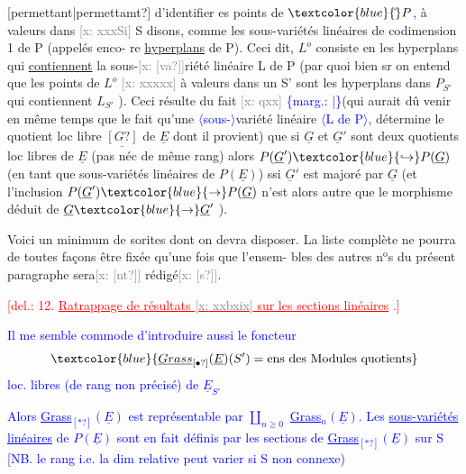 \documentclass[11pt]{article}
\newcommand{\scanpage}[1]{\par\bigskip\noindent{\small\sffamily[scan #1]}\par}
\newcommand{\mspage}[1]{{\small\sffamily[p.\,#1]}}
\newcommand{\hand}[1]{\textcolor{blue}{#1}}
\let\over\relax
\newcommand{\over}[2]{\textcolor{gray}{#1}\textcolor{blue}{\ensuremath{^{\!\nearrow}}#2}}
\newcommand{\inserted}[2][]{\textcolor{blue}{$\langle$#2$\rangle$}}
\newcommand{\margin}[1]{\textcolor{blue}{\{\textsf{marg.:} #1\}}}
\newcommand{\deleted}[1]{\textcolor{red}{[\textsf{del.:} #1]}}
\newcommand{\xout}[1]{\textcolor{gray}{[\textsf{x:} #1]}}
\newcommand{\uline}[1]{\underline{#1}}
\newcommand{\unsure}[1]{[#1?]}
\begin{document}
\unsure{permettant|permettamt} d'identifier \over{L}{\unsure{l}}es points de $\hand{\check{}}P$\hand{,} à valeurs dans \xout{xxxSi} S disons\hand{,}
comme les sous-variétés linéaires de codimension 1 de P (appelés enco-%
re \uline{hyperplans} de P). Ceci dit, $L^{o}$ consiste en les hyperplans qui
\uline{contiennent} la sous-\xout{\unsure{va}}riété linéaire L de P (par quoi bien s\over{u}{û}r on
entend que les points de $L^{o}$ \xout{xxxxx} à valeurs dans un S' sont les
hyperplans dans $P_{S'}$ qui contiennent $L_{S'}$ ). Ceci résulte du fait \xout{qxx}
\margin{|}(qui aurait dû venir en même temps que le fait qu'une \inserted[typed]{sous-}variété linéaire \inserted[typed]{L de P}\hand{,}
détermine le quotient loc libre $\underline{\unsure{G}}$ de $\underline{E}$ dont il provient) que si
$\underline{G}$ et $\underline{G}'$ sont deux quotients loc libres de $\underline{E}$ (pas néc de même rang)
alors $P(\underline{G}')\hand{\hookrightarrow}P(\underline{G})$ (en tant que sous-variétés linéaires de $P(\underline{E})$) ssi
$\underline{G}'$ est majoré par $\underline{G}$ (et l'inclusion $P(\underline{G}')\hand{\rightarrow}P(\underline{G})$ n'est alors autre
que le morphisme déduit de $\underline{G}\hand{\rightarrow}\underline{G}'$ ).

Voici un minimum de sorites dont on devra disposer. La liste
complète ne pourra de toutes façons être fixée qu'une fois que l'ensem-%
bles des autres n$^{\text{o}}$s du présent paragraphe sera\xout{\unsure{nt}} rédigé\xout{\unsure{s}}.

\deleted{12. \uline{Ratrappage de résultats \xout{xxbxix} sur les sections linéaires} .}

\hand{Il me semble commode d'introduire}
\hand{aussi le foncteur}
\[ \hand{\uline{Grass}_{\unsure{\bullet}}(\underline{E})(S') = \text{ens des Modules quotients}} \]
\hand{loc. libres (de rang}
\hand{non précisé) de $\underline{E}_{S'}$}

\hand{Alors \uline{Grass}$_{\unsure{*}}(\underline{E})$ est représentable par}
\hand{$\coprod_{n\geq 0}$ \uline{Grass}$_{n}(\underline{E})$. Les \uline{sous-variétés linéaires}}
\hand{de $P(\underline{E})$ sont en fait définis par les}
\hand{sections de \uline{Grass}$_{\unsure{*}}(\underline{E})$ sur S [NB. le}
\hand{rang i.e. la dim relative peut varier si S non connexe)}

\mspage{\hand{65}}

\clearpage
\scanpage{25/66}
\mspage{\hand{\unsure{21}}}
\end{document}
